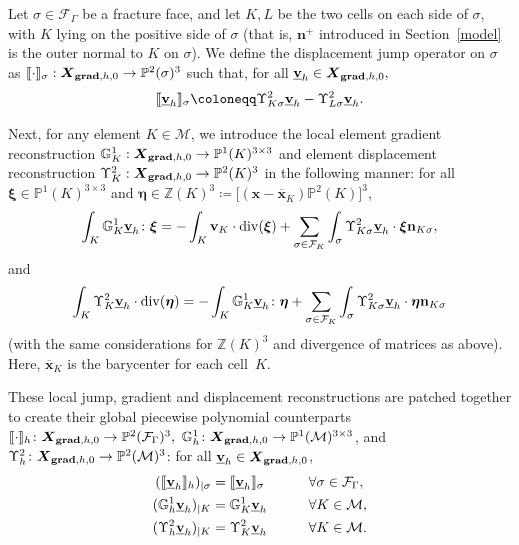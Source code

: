 \documentclass[a4paper,11pt]{article}
\theoremstyle{definition}
\theoremstyle{remark}
\newcommand{\uvec}[1]{\underline{\mathbf{#1}}}
\newcommand{\bvec}[1]{\boldsymbol{#1}}
\newcommand{\bo}[1]{\mathbf{#1}}
\newcommand{\bx}{\bvec{x}}
\newcommand{\bos}[1]{\boldsymbol{#1}}
\newcommand{\up}[1]{\Upsilon^2_{#1}}
\newcommand{\dgr}[1]{\mathbb G^1_{#1}}
\def\G{\mathbb{G}}
\def\cF{\mathcal{F}}
\def\cM{\mathcal{M}}
\def\Up{\Upsilon}
\def\bv{{\bf{v}}}
\def\ddgs{\boldsymbol{X}_{{\bf grad},h,0}}
\def\sjump#1{[\hskip -1.5pt[#1]\hskip -1.5pt]}
\newcommand{\DIV}{\operatorname{\mathrm{div}}}
\begin{document}
Let $\sigma\in\cF_\Gamma$ be a fracture face, and let $K,L$ be the two cells on each side of $\sigma$, with $K$ lying on the positive side of $\sigma$ (that is, $\bo{n}^+$ introduced in Section~\ref{model} is the outer normal to $K$ on $\sigma$). We define the displacement jump operator on $\sigma$ as $\sjump{\cdot}_{\sigma}:\ddgs\rightarrow \mathbb{P}^2(\sigma)^3$ such that, for all $\uvec{v}_h\in\ddgs,$
\begin{align}\label{eq:discrete.jump}
\sjump{\uvec{v}_h}_{\sigma}\coloneqq \up{K\sigma}\uvec{v}_h-\up{L\sigma}\uvec{v}_h.
\end{align}

Next, for any element $K\in\cM$, we introduce the local element gradient reconstruction $\mathbb G^1_{K}:\ddgs\rightarrow \mathbb P^1(K)^{3\times 3}$ and element displacement reconstruction $\Upsilon^2_{K}:\ddgs\rightarrow \mathbb P^2(K)^3$ in the following manner: for all $\bos{\xi}\in\mathbb P^1(K)^{3\times 3}$ and $\bos{\eta}\in\mathbb Z(K)^3\coloneqq\big[(\bx-\overline{\bx}_K)\mathbb P^2(K)\big]^3$,
\begin{equation}\label{eq:G1K}
\int_K \G^1_{K}\underline{\bv}_h\colon\bos{\xi}=-\int_K \bo{v}_K\cdot\DIV(\bos{\xi})+\sum_{\sigma\in\cF_K}\int_\sigma \Up^2_{K\sigma}\underline{\bv}_h\cdot\bos{\xi}{\bo{\bf n}_{K\sigma}},
\end{equation}
and
\begin{equation*} %
\int_K \Up^2_{K}\underline{\bv}_h\cdot\DIV(\bos{\eta})=-\int_K \G^1_{K}\underline{\bv}_h\colon\bos{\eta}+\sum_{\sigma\in\cF_K}\int_\sigma \Up^2_{K\sigma}\underline{\bv}_h\cdot\bos{\eta}{\bo{\bf n}_{K\sigma}}
\end{equation*}
(with the same considerations for $\mathbb Z(K)^3$ and divergence of matrices as above). Here, $\overline{\bx}_K$ is the barycenter for each cell~$K.$

These local jump, gradient and displacement reconstructions are patched together to create their global piecewise polynomial counterparts $\sjump{\cdot}_h\colon \ddgs\rightarrow \mathbb{P}^2(\cF_\Gamma)^3,~\dgr{h}\colon \ddgs\rightarrow \mathbb P^1(\cM)^{3\times 3}$, and $\up{h}\colon \ddgs\rightarrow \mathbb P^2(\cM)^3$: for all $\uvec{v}_h\in\ddgs$,
\begin{alignat*}{2}
(\sjump{\uvec{v}_h}_h)_{|\sigma}&=\sjump{\uvec{v}_h}_{\sigma}&&\qquad\forall \sigma\in \mathcal{F}_\Gamma,\\
(\dgr{h}\uvec{v}_h)_{|K}&=\dgr{K}\uvec{v}_h&&\qquad\forall K\in \mathcal{M},\\
(\up{h}\uvec{v}_h)_{|K}&=\up{K}\uvec{v}_h&&\qquad\forall K\in \mathcal{M}.
\end{alignat*}
\end{document}
